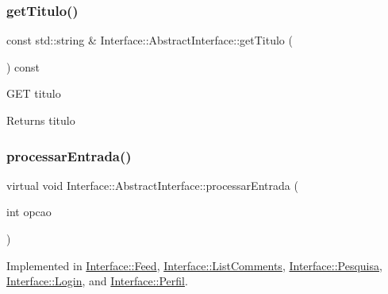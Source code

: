 \mbox{\label{class_interface_1_1_abstract_interface_a0c6e8efa0eb89f97157e0e5b28012cb6}} 
\subsubsection{\texorpdfstring{get\+Titulo()}{getTitulo()}}
{\footnotesize\ttfamily const std\+::string \& Interface\+::\+Abstract\+Interface\+::get\+Titulo (\begin{DoxyParamCaption}{ }\end{DoxyParamCaption}) const}

G\+ET titulo \begin{DoxyReturn}{Returns}
titulo 
\end{DoxyReturn}
\mbox{\label{class_interface_1_1_abstract_interface_a9318f98f907ce54ef2dbf892ba327da2}} 
\subsubsection{\texorpdfstring{processar\+Entrada()}{processarEntrada()}}
{\footnotesize\ttfamily virtual void Interface\+::\+Abstract\+Interface\+::processar\+Entrada (\begin{DoxyParamCaption}\item[{int}]{opcao }\end{DoxyParamCaption})\hspace{0.3cm}{\ttfamily [pure virtual]}}



Implemented in \hyperlink{class_interface_1_1_feed_a16fbbeb11ad125e2633bb72b0c2ab4bf}{Interface\+::\+Feed}, \hyperlink{class_interface_1_1_list_comments_a5b02d2e6a845fd356bfc7d4e418b9c3c}{Interface\+::\+List\+Comments}, \hyperlink{class_interface_1_1_pesquisa_aad98a86ce0fd0ef1bcd1d80bd24f167f}{Interface\+::\+Pesquisa}, \hyperlink{class_interface_1_1_login_aeaba3261aa3a44806e98fcf67375e408}{Interface\+::\+Login}, and \hyperlink{class_interface_1_1_perfil_a699f6dc5e49e072288f2fde2c220a0fc}{Interface\+::\+Perfil}.



